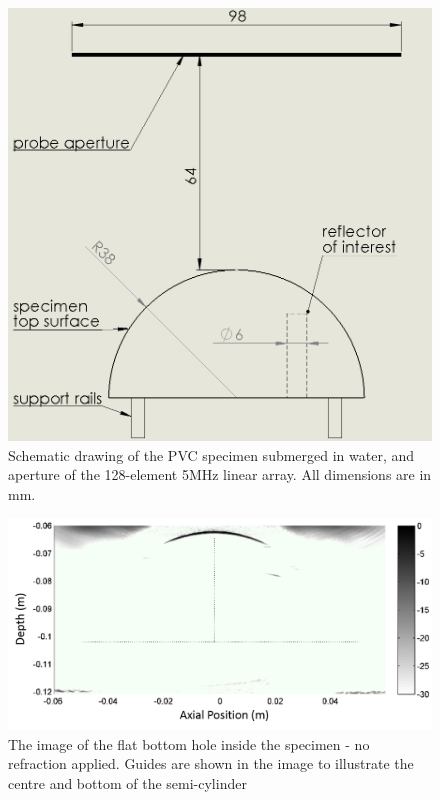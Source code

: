 \begin{figure}[htbp!]
\centering
		\includegraphics[width=125mm]{schematic.png}
		\caption{Schematic drawing of the PVC specimen submerged in water, and aperture of the 128-element 5MHz linear array. All dimensions are in mm.}
		\label{fig:cuetfm_experiment_setup}
\end{figure}

\begin{figure}[htbp!]
\centering
		\includegraphics[width=\textwidth]{result-uncorrected.png}
		\caption{The image of the flat bottom hole inside the specimen - no refraction applied. Guides are shown in the image to illustrate the centre and bottom of the semi-cylinder}
		\label{fig:cuetfm_experiment_uncorrected}
\end{figure}

